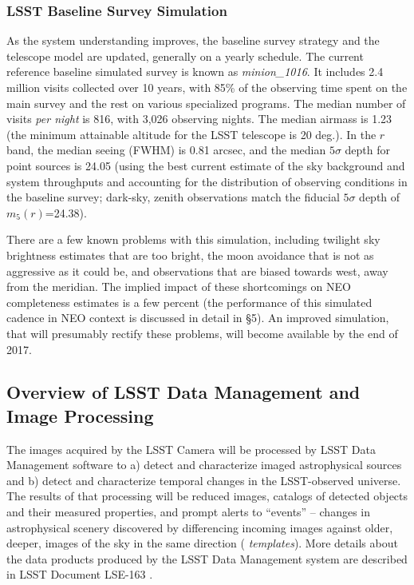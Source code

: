 \subsubsection{LSST Baseline Survey Simulation}

As the system understanding improves, the baseline survey strategy and the telescope model
are updated, generally on a yearly schedule. The current
reference baseline simulated survey is known as {\it minion\_1016}. It includes 2.4
million visits collected over 10 years, with 85\% of the observing time spent on the
main survey and the rest on various specialized programs. The median number of visits
{\it per night} is 816, with 3,026 observing nights. The median airmass is 1.23 (the
minimum attainable altitude for the LSST telescope is 20 deg.). In the $r$ band, the median
seeing (FWHM) is 0.81 arcsec, and the median $5\sigma$ depth for point sources is 24.05
(using the best current estimate of the sky background and system throughputs and accounting
for the distribution of observing conditions in the baseline survey; dark-sky, zenith observations
match the fiducial $5\sigma$ depth of $m_5(r)$=24.38).

There are a few known problems with this simulation, including twilight sky brightness
estimates that are too bright, the moon avoidance that is not as aggressive as it could be,
and observations that are biased towards west, away from the meridian. The implied impact
of these shortcomings on NEO completeness estimates is a few percent (the performance
of this simulated cadence in NEO context is discussed in detail in \S5). An improved simulation,
that will presumably rectify these problems, will become available by the end of 2017.


\subsection{Overview of LSST  Data Management and Image Processing}

The images acquired by the LSST Camera will be processed by LSST Data Management
software \citep{juric15} to a) detect and characterize imaged
astrophysical sources and b) detect and characterize temporal changes
in the LSST-observed universe. The results of that processing will be
reduced images, catalogs of detected objects and their measured properties, and
prompt alerts to ``events'' -- changes in astrophysical scenery discovered by differencing
incoming images against older, deeper, images of the sky in the same direction ({\em
templates}). More details about the data products produced by the LSST Data Management system are described in
LSST Document LSE-163 \citep[LSST Data Products
Definition Document,][]{LSE-163}.

